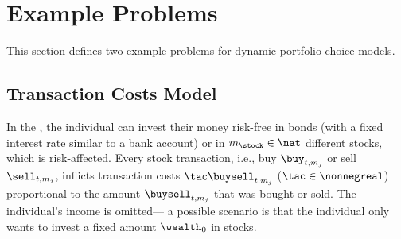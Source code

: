 \section{Example Problems}
\label{sec:83problems}


\noindent
This section defines two example problems for
dynamic portfolio choice models.



\subsection{Transaction Costs Model}

In the  \cite{Schober18Solving},
the individual can invest their money risk-free in bonds
(with a fixed interest rate similar to a bank account)
or in $m_\stock \in \nat$ different stocks, which is risk-affected.
Every stock transaction,
i.e., buy $\buy_{t,m_j}$ or sell $\sell_{t,m_j}$,
inflicts transaction costs $\tac \buysell_{t,m_j}$ ($\tac \in \nonnegreal$)
proportional to the amount $\buysell_{t,m_j}$ that was bought or sold.
The individual's income is omitted---%
a possible scenario is that the individual only wants to invest a fixed
amount $\wealth_0$ in stocks.

